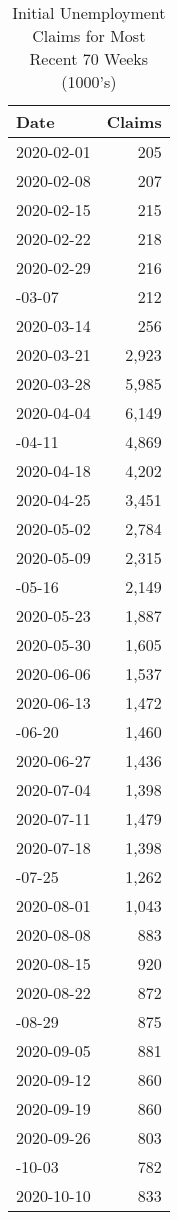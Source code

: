 \documentclass[
]{book}
\begin{document}
\begin{table}

\caption{\label{tab:initial}Initial Unemployment Claims for Most Recent 70 Weeks 
 (1000's)}
\centering
\begin{tabular}[t]{lr}
\toprule
Date & Claims\\
\midrule
2020-02-01 & 205\\
2020-02-08 & 207\\
2020-02-15 & 215\\
2020-02-22 & 218\\
2020-02-29 & 216\\
\addlinespace
2020-03-07 & 212\\
2020-03-14 & 256\\
2020-03-21 & 2,923\\
2020-03-28 & 5,985\\
2020-04-04 & 6,149\\
\addlinespace
2020-04-11 & 4,869\\
2020-04-18 & 4,202\\
2020-04-25 & 3,451\\
2020-05-02 & 2,784\\
2020-05-09 & 2,315\\
\addlinespace
2020-05-16 & 2,149\\
2020-05-23 & 1,887\\
2020-05-30 & 1,605\\
2020-06-06 & 1,537\\
2020-06-13 & 1,472\\
\addlinespace
2020-06-20 & 1,460\\
2020-06-27 & 1,436\\
2020-07-04 & 1,398\\
2020-07-11 & 1,479\\
2020-07-18 & 1,398\\
\addlinespace
2020-07-25 & 1,262\\
2020-08-01 & 1,043\\
2020-08-08 & 883\\
2020-08-15 & 920\\
2020-08-22 & 872\\
\addlinespace
2020-08-29 & 875\\
2020-09-05 & 881\\
2020-09-12 & 860\\
2020-09-19 & 860\\
2020-09-26 & 803\\
\addlinespace
2020-10-03 & 782\\
2020-10-10 & 833\\

\end{tabular}
\end{table}
\end{document}
